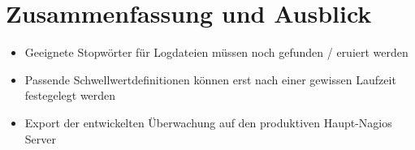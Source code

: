 \section{Zusammenfassung und Ausblick}

\begin{itemize}
\item Geeignete Stopwörter für Logdateien müssen noch gefunden / eruiert werden
\item Passende Schwellwertdefinitionen können erst nach einer gewissen Laufzeit festegelegt werden
\item Export der entwickelten Überwachung auf den produktiven Haupt-Nagios Server
\end{itemize}